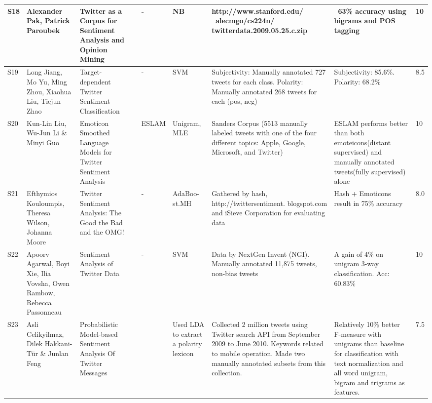 \begin{landscape}
\begin{supertabular}{|P{0.5cm}|P{2.8cm}|P{3.5cm}|P{0.6cm}|P{1cm}|P{1cm}|P{3.3cm}|P{3cm}|P{0.5cm}|}
		S18 & Alexander Pak, Patrick Paroubek & Twitter as a Corpus for Sentiment Analysis and Opinion Mining & \citeyear{article:pak} & - & NB & http://www.stanford.edu/  ~alecmgo/cs224n/ twitterdata.2009.05.25.c.zip & ~63\% accuracy using bigrams and POS tagging & 10 \\ \hline 
		
		S19 & Long Jiang, Mo Yu, Ming Zhou, Xiaohua Liu, Tiejun Zhao & Target-dependent Twitter Sentiment Classification & \citeyear{article:jiang} & - & SVM & Subjectivity: Manually annotated 727 tweets for each class. Polarity: Manually annotated 268 tweets for each (pos, neg) & Subjectivity: 85.6\%. Polarity: 68.2\% & 8.5 \\ \hline  
		    
		S20 & Kun-Lin Liu, Wu-Jun Li \& Minyi Guo & Emoticon Smoothed Language Models for Twitter Sentiment Analysis & \citeyear{liu2012emoticon} & ESLAM & Unigram, MLE & Sanders Corpus (5513 manually labeled tweets with one of the four different topics: Apple, Google, Microsoft, and Twitter) & ESLAM performs better than both emoteicons(distant supervised) and manually annotated tweets(fully supervised) alone & 10 \\ \hline  
		
		S21 & Efthymios Kouloumpis, Theresa Wilson, Johanna Moore & Twitter Sentiment Analysis: The Good the Bad and the OMG! & \citeyear{article:omg} & - & AdaBoo-st.MH & Gathered by hash, http://twittersentiment. blogspot.com and iSieve Corporation for evaluating data & Hash + Emoticons result in 75\% accuracy & 8.0 \\ \hline  
		
		S22 & Apoorv Agarwal, Boyi Xie, Ilia Vovsha, Owen Rambow, Rebecca Passonneau & Sentiment Analysis of Twitter Data & \citeyear{vovsha2011sentiment} & - & SVM & Data by NextGen Invent (NGI). Manually annotated 11,875 tweets, non-bias tweets & A gain of 4\% on unigram 3-way classification. Acc: 60.83\% & 10 \\ \hline  
		
		S23 & Asli Celikyilmaz, Dilek Hakkani-T\"{u}r \& Junlan Feng  & Probabilistic Model-based Sentiment Analysis Of Twitter Messages & \citeyear{celikyilmaz2010probabilistic} &  & Used LDA to extract a polarity lexicon & Collected 2 million tweets using Twitter search API from September 2009 to June 2010. Keywords related to mobile operation. Made two manually annotated subsets from this collection. & Relatively 10\% better F-measure with unigrams than baseline for classification with text normalization and all word unigram, bigram and trigrams as features. & 7.5 \\
		
	\end{supertabular}
\end{landscape}